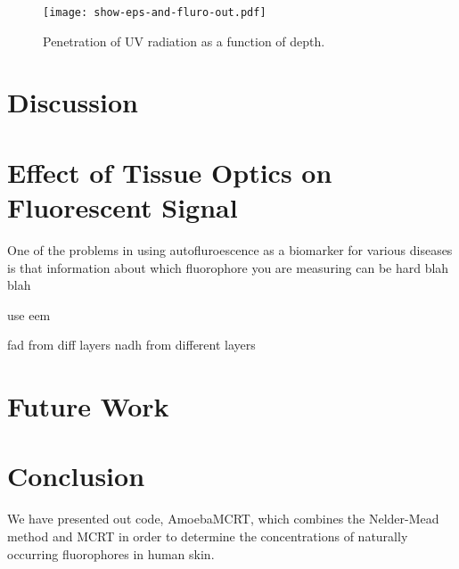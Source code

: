 \begin{figure}[!htpb]
    \centering
    \texttt{[image: show-eps-and-fluro-out.pdf]}
    \caption{Penetration of UV radiation as a function of depth.}
    \label{fig:epsfluro}
\end{figure}

\section{Discussion}

\section{Effect of Tissue Optics on Fluorescent Signal}

One of the problems in using autofluroescence as a biomarker for various diseases is that information about which fluorophore you are measuring can be hard blah blah

use eem

fad from diff layers
nadh from different layers


\section{Future Work}

\section{Conclusion}

We have presented out code, AmoebaMCRT, which combines the Nelder-Mead method and MCRT in order to determine the concentrations of naturally occurring fluorophores in human skin.



